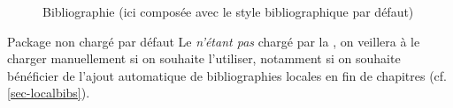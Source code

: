 \begin{figure}[htbp]
  \centering
  \caption[Bibliographie]{Bibliographie (ici composée avec le style
    bibliographique par défaut)}
  \label{fig-printbibliography}
\end{figure}

\begin{dbwarning}{Package  non chargé par défaut}{}
  Le  \emph{n'étant pas} chargé par la \yatCl, on veillera
  à le charger manuellement si on souhaite l'utiliser, notamment si on souhaite
  bénéficier de l'ajout automatique de bibliographies locales en fin de
  chapitres (cf. \vref{sec-localbibs}).
\end{dbwarning}

